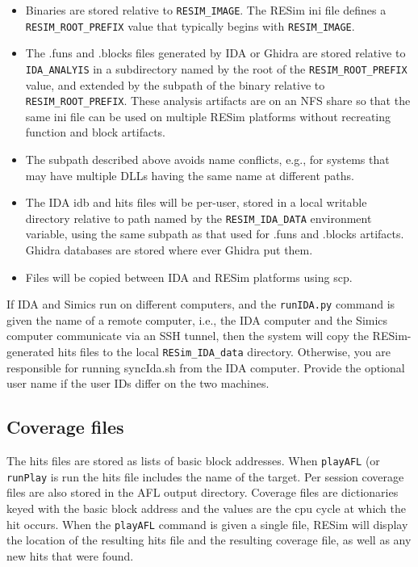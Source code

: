 \documentclass[titlepage]{article}
\begin{document}
\begin{itemize}

\item Binaries are stored relative to {\tt RESIM\_IMAGE}.  The RESim ini file defines a {\tt RESIM\_ROOT\_PREFIX} value
that typically begins with {\tt RESIM\_IMAGE}. 

\item The .funs and .blocks files generated by IDA or Ghidra are stored relative to {\tt IDA\_ANALYIS} in a subdirectory
named by the root of the {\tt RESIM\_ROOT\_PREFIX} value, and extended by the subpath of the binary relative to 
{\tt RESIM\_ROOT\_PREFIX}.  These analysis artifacts are on an NFS share so that the same ini file can be used on multiple RESim platforms
without recreating function and block artifacts.

\item The subpath described above avoids name conflicts, e.g., for systems that may have multiple DLLs having the same name at different paths.

\item The IDA idb and hits files will be per-user, stored in a local writable directory relative to path 
named by the {\tt RESIM\_IDA\_DATA} environment variable, using the same subpath as that used for .funs and .blocks artifacts.  
Ghidra databases are stored where ever Ghidra put them.

\item Files will be copied between IDA and RESim platforms using scp. 
\end{itemize}

If IDA and Simics run on different computers, and the {\tt runIDA.py} command is given the name of a remote 
computer, i.e., the IDA computer and the Simics computer communicate via an SSH tunnel, 
then the system will copy the RESim-generated hits files to the local {\tt RESim\_IDA\_data} directory.  
Otherwise, you are responsible for running syncIda.sh from the IDA computer.  Provide the optional user name
if the user IDs differ on the two machines.


\subsection{Coverage files}
The hits files are stored as lists of basic block addresses.  When {\tt playAFL} (or {\tt runPlay} is run the hits
file includes the name of the target.  Per session coverage files are also stored in the AFL output
directory.  Coverage files are dictionaries keyed with the basic block address and the values are the
cpu cycle at which the hit occurs.  When the {\tt playAFL} command is given a single file, RESim will
display the location of the resulting hits file and the resulting coverage file, as well as any new
hits that were found.
\end{document}
